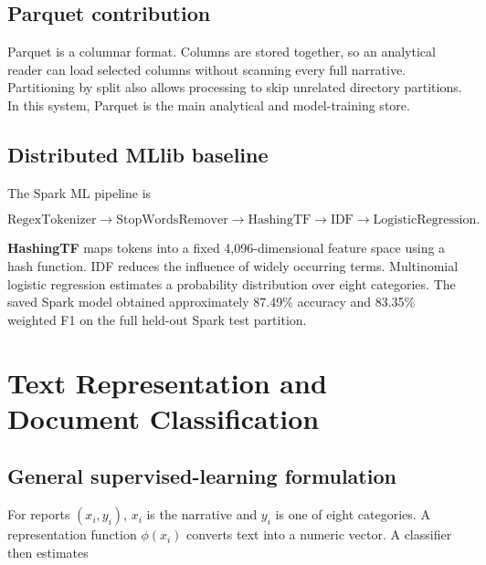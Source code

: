 \documentclass[12pt,a4paper]{report}
\begin{document}
\section{Parquet contribution}

Parquet is a columnar format. Columns are stored together, so an analytical reader can load selected columns without scanning every full narrative. Partitioning by split also allows processing to skip unrelated directory partitions. In this system, Parquet is the main analytical and model-training store.

\section{Distributed MLlib baseline}

The Spark ML pipeline is

\begin{equation}
\text{RegexTokenizer}
\rightarrow\text{StopWordsRemover}
\rightarrow\text{HashingTF}
\rightarrow\text{IDF}
\rightarrow\text{LogisticRegression}.
\end{equation}

\textbf{HashingTF} maps tokens into a fixed 4,096-dimensional feature space using a hash function. IDF reduces the influence of widely occurring terms. Multinomial logistic regression estimates a probability distribution over eight categories. The saved Spark model obtained approximately 87.49\% accuracy and 83.35\% weighted F1 on the full held-out Spark test partition.

\chapter{Text Representation and Document Classification}

\section{General supervised-learning formulation}

For reports $(x_i,y_i)$, $x_i$ is the narrative and $y_i$ is one of eight categories. A representation function $\phi(x_i)$ converts text into a numeric vector. A classifier then estimates
\end{document}
